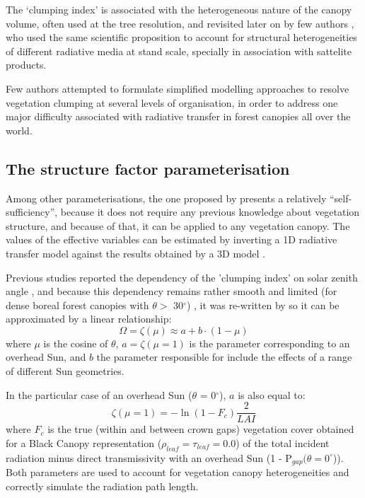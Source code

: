 The `clumping index' \citep{Nilson1971,Norman1974,Chen1996} is associated with the heterogeneous nature of the canopy volume, often used at the tree resolution, and revisited later on by few authors \citep{Pinty2004,pinty2006}, who used the same scientific proposition to account for structural heterogeneities of different radiative media at stand scale, specially in association with sattelite products.

Few authors \citep{Kucharik1999,pinty2006,Ni-Meister2010} attempted to formulate simplified modelling approaches to resolve vegetation clumping at several levels of organisation, in order to address one major difficulty associated with radiative transfer in forest canopies all over the world.

\subsection{The structure factor parameterisation}
Among other parameterisations, the one proposed by \citet{pinty2006} presents a relatively ``self-sufficiency'', because it does not require any previous knowledge about vegetation structure, and because of that, it can be applied to any vegetation canopy. The values of the effective variables can be estimated by inverting a 1D radiative transfer model against the results obtained by a 3D model \citep{pinty2006}.

Previous studies reported the dependency of the 'clumping index' on solar zenith angle \citep{Andrieu1993,Chen1996,Kucharik1999,Leblanc2005,Ryu2010}, and because this dependency remains rather smooth and limited (for dense boreal forest canopies with $\theta >$ 30$^{\circ}$) \citep{Chen1997a,Chen1997}, it was re-written by \citet{pinty2006} so it can be approximated by a linear relationship:
\begin{equation}
\Omega = \zeta(\mu) \approx a + b \cdot (1 - \mu)
\label{equation:structurefactor}
\end{equation}
\noindent where $\mu$ is the cosine of $\theta$, $a = \zeta(\mu=1)$ is the parameter corresponding to an overhead Sun, and $b$ the parameter responsible for include the effects of a range of different Sun geometries.

In the particular case of an overhead Sun ($\theta$ = 0$^{\circ}$), $a$ is also equal to:
 \begin{equation}
\zeta(\mu=1) = -\ln{(1 - F_c)}\frac{2}{LAI}
\label{equation:structurefactora}
\end{equation}
\noindent where $F_c$ is the true (within and between crown gaps) vegetation cover obtained for a Black Canopy representation ($\rho_{leaf} = \tau_{leaf} = 0.0$) of the total incident radiation minus direct transmissivity with an overhead Sun (1 - P$_{gap}(\theta = 0^{\circ}$)).
Both parameters are used to account for vegetation canopy heterogeneities and correctly simulate the radiation path length. 

